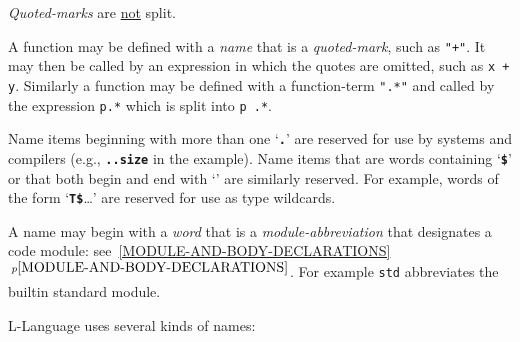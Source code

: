\documentclass[12pt]{article}
\newcommand{\TT}[1]{{\tt \bfseries #1}}
\newcommand{\itemref}[1]{\ref{#1}$\,^{p\pageref{#1}}$}
\begin{document}
{\em Quoted-marks} are \underline{not} split.

A function may be defined with a {\em name} that is a {\em quoted-mark},
such as {\tt "+"}.  It may then be called by an expression in which the
quotes are omitted, such as {\tt x + y}.  Similarly a function may be
defined with a function-term {\tt ".*"} and called by the expression
{\tt p.*} which is split into {\tt p .*}.


Name items beginning with more than one `\TT{.}' are reserved
for use by systems and compilers (e.g., \TT{..size} in the example).
Name items that are words containing `\TT{\$}' or that both
begin and end with `\TT{*}' are
similarly reserved.  For example, words of the form `\TT{T\$}\ldots'
are reserved for use as type wildcards.

A name may begin with a {\em word} that is a {\em module-abbreviation}
that designates a code module: see~\itemref{MODULE-AND-BODY-DECLARATIONS}.
For example {\tt std} abbreviates the builtin standard module.

L-Language uses several kinds of names:
\end{document}
